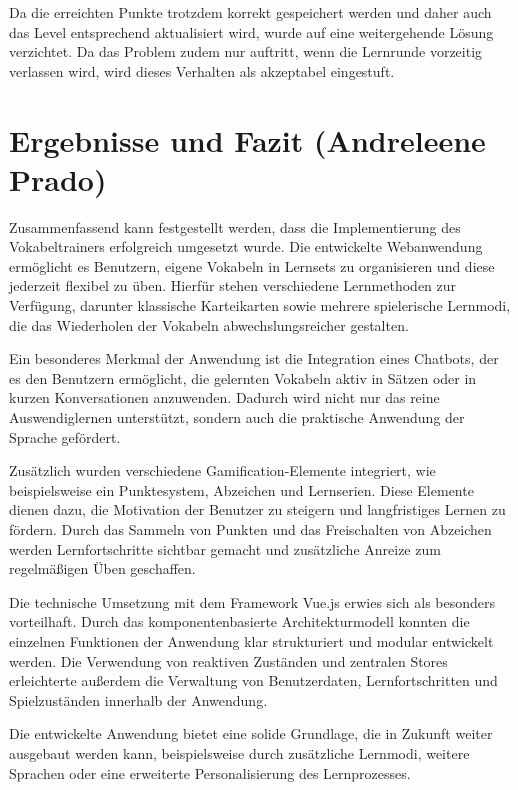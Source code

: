 Da die erreichten Punkte trotzdem korrekt gespeichert werden und daher auch das Level entsprechend aktualisiert wird, wurde auf eine weitergehende Lösung verzichtet. 
Da das Problem zudem nur auftritt, wenn die Lernrunde vorzeitig verlassen wird, wird dieses Verhalten als akzeptabel eingestuft.

\section{Ergebnisse und Fazit (Andreleene Prado)}

Zusammenfassend kann festgestellt werden, dass die Implementierung des Vokabeltrainers erfolgreich umgesetzt wurde. 
Die entwickelte Webanwendung ermöglicht es Benutzern, eigene Vokabeln in Lernsets zu organisieren und diese jederzeit flexibel zu üben. 
Hierfür stehen verschiedene Lernmethoden zur Verfügung, darunter klassische Karteikarten sowie mehrere spielerische Lernmodi, die das Wiederholen der Vokabeln abwechslungsreicher gestalten.

Ein besonderes Merkmal der Anwendung ist die Integration eines Chatbots, der es den Benutzern ermöglicht, die gelernten Vokabeln aktiv in Sätzen oder in kurzen Konversationen anzuwenden. 
Dadurch wird nicht nur das reine Auswendiglernen unterstützt, sondern auch die praktische Anwendung der Sprache gefördert.

Zusätzlich wurden verschiedene Gamification-Elemente integriert, wie beispielsweise ein Punktesystem, Abzeichen und Lernserien. 
Diese Elemente dienen dazu, die Motivation der Benutzer zu steigern und langfristiges Lernen zu fördern. 
Durch das Sammeln von Punkten und das Freischalten von Abzeichen werden Lernfortschritte sichtbar gemacht und zusätzliche Anreize zum regelmäßigen Üben geschaffen.

Die technische Umsetzung mit dem Framework Vue.js erwies sich als besonders vorteilhaft. 
Durch das komponentenbasierte Architekturmodell konnten die einzelnen Funktionen der Anwendung klar strukturiert und modular entwickelt werden. 
Die Verwendung von reaktiven Zuständen und zentralen Stores erleichterte außerdem die Verwaltung von Benutzerdaten, Lernfortschritten und Spielzuständen innerhalb der Anwendung.

Die entwickelte Anwendung bietet eine solide Grundlage, die in Zukunft weiter ausgebaut werden kann, beispielsweise durch zusätzliche Lernmodi, weitere Sprachen oder eine erweiterte Personalisierung des Lernprozesses.
